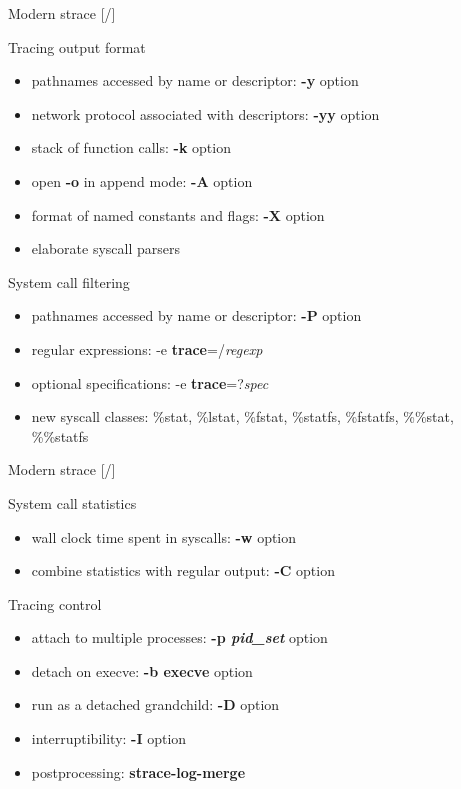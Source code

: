 \documentclass[unicode,aspectratio=169]{beamer}
\begin{document}
\begin{frame}{Modern strace \hfill [\insertframenumber/\inserttotalframenumber]}
\large
\begin{block}{\large Tracing output format}
\begin{itemize}
\item pathnames accessed by name or descriptor: \textbf{-y} option
\item network protocol associated with descriptors: \textbf{-yy} option
\item stack of function calls: \textbf{-k} option
\item open \textbf{-o} in append mode: \textbf{-A} option
\item format of named constants and flags: \textbf{-X} option
\item elaborate syscall parsers
\end{itemize}
\end{block}

\begin{block}{\large System call filtering}
\begin{itemize}
\item pathnames accessed by name or descriptor: \textbf{-P} option
\item regular expressions: -e \textbf{trace}=/\textit{regexp}
\item optional specifications: -e \textbf{trace}=?\textit{spec}
\item new syscall classes: \%stat, \%lstat, \%fstat, \%statfs, \%fstatfs, \%\%stat, \%\%statfs
\end{itemize}
\end{block}
\end{frame}

\begin{frame}{Modern strace \hfill [\insertframenumber/\inserttotalframenumber]}
\large
\begin{block}{\large System call statistics}
\begin{itemize}
\item wall clock time spent in syscalls: \textbf{-w} option
\item combine statistics with regular output: \textbf{-C} option
\end{itemize}
\end{block}

\begin{block}{\large Tracing control}
\begin{itemize}
\item attach to multiple processes: \textbf{-p \textit{pid\_set}} option
\item detach on execve: \textbf{-b execve} option
\item run as a detached grandchild: \textbf{-D} option
\item interruptibility: \textbf{-I} option
\item postprocessing: \textbf{strace-log-merge}
\end{itemize}
\end{block}
\end{frame}
\end{document}
